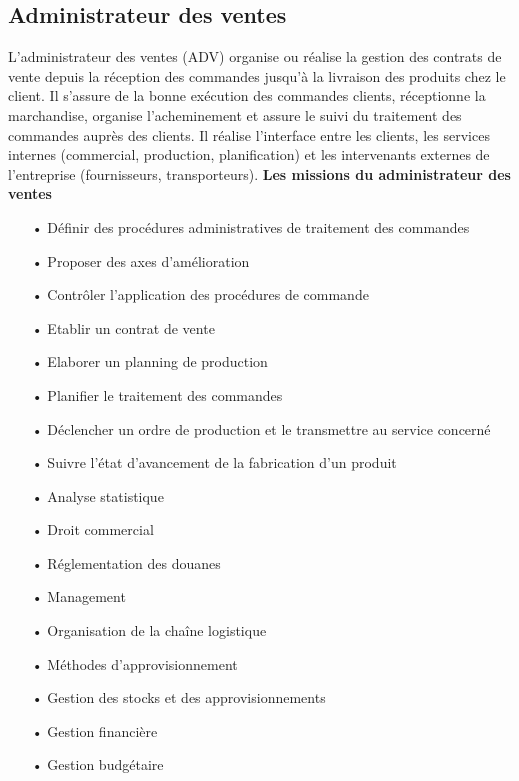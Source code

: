 \documentclass[edit,12pt,a4paper,ChapStyle,oneside,doubleinterligne]{report}
\begin{document}
\subsection{Administrateur des ventes}
L’administrateur des ventes (ADV) organise ou réalise la gestion des contrats de vente depuis la réception des commandes jusqu'à la livraison des produits chez le client. Il s’assure de la bonne exécution des commandes clients, réceptionne la marchandise, organise l’acheminement et assure le suivi du traitement des commandes auprès des clients. Il réalise l'interface entre les clients, les services internes (commercial, production, planification) et les intervenants externes de l'entreprise (fournisseurs, transporteurs)\cite{Administrateur}.
\newline\newline\textbf{Les missions du  administrateur des ventes}\newline
\begin{itemize}
    \item [•] Définir des procédures administratives de traitement des commandes 
    \item [•] Proposer des axes d'amélioration 
    \item [•] Contrôler l'application des procédures de commande 
    \item [•] Etablir un contrat de vente 
    \item [•] Elaborer un planning de production
    \item [•] Planifier le traitement des commandes 
    \item [•] Déclencher un ordre de production et le transmettre au service concerné 
    \item [•] Suivre l'état d'avancement de la fabrication d'un produit 
    \item [•] Analyse statistique
    \item [•] Droit commercial
    \item [•] Réglementation des douanes
    \item [•] Management
    \item [•] Organisation de la chaîne logistique
    \item [•] Méthodes d'approvisionnement
    \item [•] Gestion des stocks et des approvisionnements
    \item [•] Gestion financière
    \item [•] Gestion budgétaire
\end{itemize}
\end{document}
